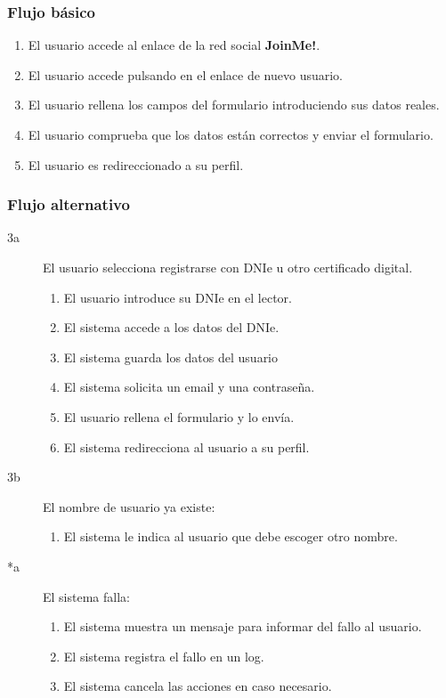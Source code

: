 \documentclass[12pt, a4paper, titlepage]{article}
\begin{document}
\subsubsection{Flujo básico}
\begin{enumerate}
	\item El usuario accede al enlace de la red social \textbf{JoinMe!}.
	\item El usuario accede pulsando en el enlace de nuevo usuario.
	\item El usuario rellena los campos del formulario introduciendo sus datos reales.
	\item El usuario comprueba que los datos están correctos y enviar el formulario.
	\item El usuario es redireccionado a su perfil.
\end{enumerate}
\subsubsection{Flujo alternativo}
\begin{description}
\item [3a] El usuario selecciona registrarse con DNIe u otro certificado digital.
	\begin{enumerate}
		\item El usuario introduce su DNIe en el lector.
		\item El sistema accede a los datos del DNIe.
		\item El sistema guarda los datos del usuario
		\item El sistema solicita un email y una contraseña.
		\item El usuario rellena el formulario y lo envía.
		\item El sistema redirecciona al usuario a su perfil.
	\end{enumerate}
\end{description}

\begin{description}
	\item [3b] El nombre de usuario ya existe:
	\begin{enumerate}
		\item El sistema le indica al usuario que debe escoger otro nombre.
	\end{enumerate}
\end{description}

\begin{description}
\item [*a] El sistema falla:
	\begin{enumerate}
		\item El sistema muestra un mensaje para informar del fallo al usuario.
		\item El sistema registra el fallo en un log.
		\item El sistema cancela las acciones en caso necesario.
	\end{enumerate}
\end{description}
\end{document}
